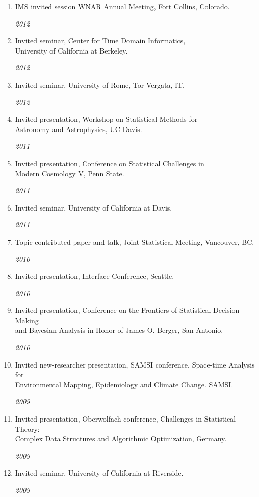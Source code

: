 \documentclass[11pt]{article}
\newcommand{\ddatedentry}[2]{
  {#1}
  \hfill
  \begin{minipage}{.5in}{\hfill\textit{#2}}\end{minipage}
  }
\begin{document}
\begin{enumerate}
\item
\ddatedentry{IMS invited session WNAR Annual Meeting, Fort Collins, Colorado.}{2012}

\item
\ddatedentry{Invited seminar, Center for Time Domain Informatics, \\ University of California at Berkeley.}{2012}

\item
\ddatedentry{Invited seminar, University of Rome, Tor Vergata, IT.}{2012}

\item
\ddatedentry{Invited presentation, Workshop on Statistical Methods for \\
Astronomy and Astrophysics, UC Davis.}{2011}


\item
\ddatedentry{Invited presentation, Conference on Statistical Challenges in \\ Modern Cosmology V, Penn State.}{2011}


\item
\ddatedentry{Invited seminar, University of California at Davis.}{2011}

\item
\ddatedentry{Topic contributed paper and talk, Joint Statistical Meeting, Vancouver, BC.}{2010}

\item
\ddatedentry{Invited presentation, Interface Conference, Seattle.}{2010}


\item
\ddatedentry{Invited presentation, Conference on the Frontiers of Statistical Decision Making\\ and  Bayesian Analysis in Honor of James O. Berger, San Antonio.}{2010}


\item
\ddatedentry{Invited new-researcher presentation, SAMSI conference, Space-time Analysis for  \\ Environmental Mapping, Epidemiology and Climate Change. SAMSI.}{2009}

\item
\ddatedentry{Invited presentation, Oberwolfach conference, Challenges in Statistical Theory: \\Complex Data Structures and Algorithmic Optimization, Germany.}{2009}


\item
\ddatedentry{Invited seminar, University of California at Riverside.}{2009}


\end{enumerate}
\end{document}

